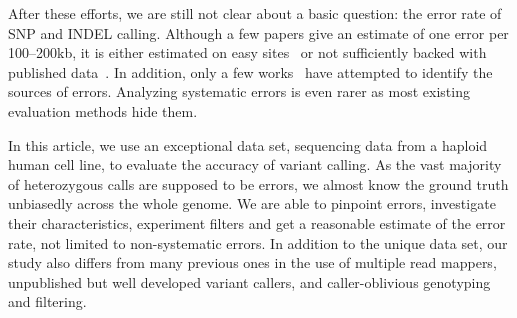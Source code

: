 \documentclass{bioinfo}
\begin{document}
After these efforts, we are still not clear about a basic question: the error
rate of SNP and INDEL calling. Although a few papers give an estimate of one
error per 100--200kb, it is either estimated on easy
sites~\citep{Bentley:2008cr} or not sufficiently backed with published
data~\citep{Nickles:2012aa}. In addition, only a few
works~\citep{Larson:2012aa,Roberts:2013aa,Kim:2013aa} have attempted to
identify the sources of errors. Analyzing systematic errors is even rarer as
most existing evaluation methods hide them.

In this article, we use an exceptional data set, sequencing data from a
haploid human cell line, to evaluate the accuracy of variant calling. As the
vast majority of heterozygous calls are supposed to be errors, we almost know
the ground truth unbiasedly across the whole genome. We are able to pinpoint
errors, investigate their characteristics, experiment filters and get a
reasonable estimate of the error rate, not limited to non-systematic errors. In
addition to the unique data set, our study also differs from many previous ones
in the use of multiple read mappers, unpublished but well developed variant
callers, and caller-oblivious genotyping and filtering.
\end{document}
